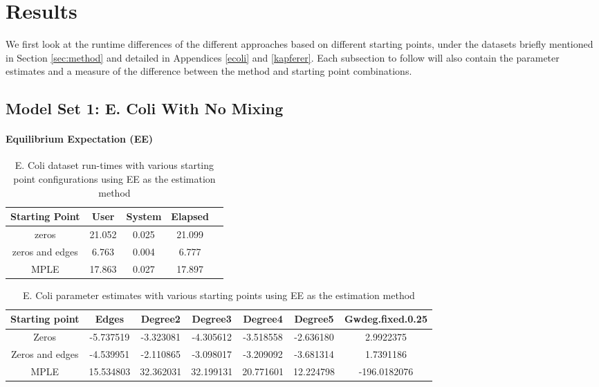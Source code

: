 \section{Results}
\label{sec:results}

We first look at the runtime differences of the different approaches based on different starting points, under the datasets briefly mentioned in Section \ref{sec:method} and detailed in Appendices \ref{ecoli} and \ref{kapferer}. Each subsection to follow will also contain the parameter estimates and a measure of the difference between the method and starting point combinations.

\subsection{Model Set 1: E. Coli With No Mixing}


\paragraph{Equilibrium Expectation (EE)}

\begin{table}[H]
 \centering
 \begin{tabular}{||c | c | c | c | c||} 
 \hline
 Starting Point & User & System & Elapsed \\
 \hline\hline
 zeros & 21.052 & 0.025 & 21.099 \\ 
 \hline
 zeros and edges & 6.763 & 0.004 & 6.777 \\
 \hline
 MPLE & 17.863 & 0.027 & 17.897 \\
 \hline
 \end{tabular}
 \label{t:ecoli1_ee}
 \caption{E. Coli dataset run-times with various starting point configurations using EE as the estimation method}
\end{table}

\begin{table}[H]
\centering
\scriptsize
\begin{tabular}{|| c | c | c | c | c | c | c ||}
\hline
Starting point & Edges & Degree2 & Degree3 & Degree4 & Degree5 & Gwdeg.fixed.0.25 \\
\hline
Zeros & -5.737519 & -3.323081 & -4.305612 & -3.518558 & -2.636180 & 2.9922375 \\
\hline
Zeros and edges & -4.539951 &-2.110865 & -3.098017 & -3.209092 & -3.681314 & 1.7391186 \\
\hline
MPLE & 15.534803 & 32.362031 & 32.199131 & 20.771601 & 12.224798 & -196.0182076 \\
\hline
\end{tabular}
\label{t:params_ecoli_ee}
\caption{E. Coli parameter estimates with various starting points using EE as the estimation method}
\end{table}

